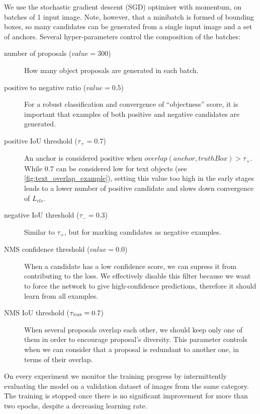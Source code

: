 		We use the stochastic gradient descent (SGD) optimiser with momentum, on batches of 1 input image. Note, however, that a minibatch is formed of bounding boxes, so many candidates can be generated from a single input image and a set of anchors. Several hyper-parameters control the composition of the batches:
		\begin{description}
			\item[number of proposals (\(\mathit{value} = 300\))] How many object proposals are generated in each batch.

			\item[positive to negative ratio (\(\mathit{value} = 0.5\))] For a robust classification and convergence of ``objectness'' score, it is important that examples of both positive and negative candidates are generated.

			\item[positive IoU threshold (\(\tau_{+} = 0.7\))] An anchor is considered positive when \(\mathit{overlap}(\mathit{anchor}, \mathit{truthBox}) > \tau_+\). While \(0.7\) can be considered low for text objects (see \autoref{fig:text_overlap_example}), setting this value too high in the early stages leads to a lower number of positive candidate and slows down convergence of \(L_{cls}\).

			\item[negative IoU threshold (\(\tau_{-} = 0.3\))] Similar to \(\tau_{+}\), but for marking candidates as negative examples.

			\item[NMS confidence threshold (\(\mathit{value} = 0.0\))] When a candidate has a low confidence score, we can supress it from contributing to the loss. We effectively disable this filter because we want to force the network to give high-confidence predictions, therefore it should learn from all examples.

			\item[NMS IoU threshold (\(\tau_{\textsc{nms}} = 0.7\))] When several proposals overlap each other, we should keep only one of them in order to encourage proposal's diversity. This parameter controls when we can consider that a proposal is redundant to another one, in terms of their overlap.

		\end{description}

		On every experiment we monitor the training progress by intermittently evaluating the model on a validation dataset of images from the same category. The training is stopped once there is no significant improvement for more than two epochs, despite a decreasing learning rate.


